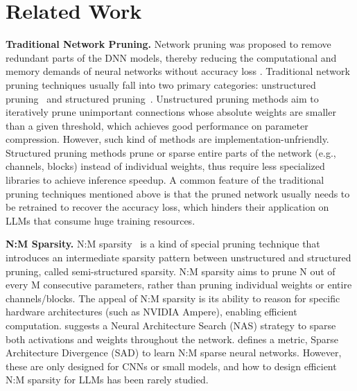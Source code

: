 \section{Related Work}

 \textbf{Traditional Network Pruning.} 
 Network pruning was proposed to remove redundant parts of the DNN models, thereby reducing the computational and memory demands of neural networks without accuracy loss \cite{liu2018rethinking,louizos2017learning, han2015deep, hassibi1993optimal}. 
 Traditional network pruning techniques usually fall into two primary categories: unstructured pruning~\cite{hassibi1993optimal, han2015learning, han2015deep} and structured pruning~\cite{li2016pruning, luo2017thinet, liu2017learning, li2020weight, li2022weight, ding2021resrep, li2021boosting, xia2022structured}.  
 Unstructured pruning methods \cite{han2015deep, han2015learning} aim to iteratively prune unimportant connections whose absolute weights are smaller than a given threshold, which achieves good performance on parameter compression. 
 However, such kind of methods are implementation-unfriendly.
  Structured pruning methods \cite{li2016pruning, luo2017thinet, liu2019metapruning} prune or sparse entire parts of the network (e.g., channels, blocks) instead of individual weights, thus require less specialized libraries to achieve inference speedup.
 A common feature of the traditional pruning techniques mentioned above is that the pruned network usually needs to be retrained to recover the accuracy loss, which hinders their application on LLMs that consume huge training resources.
 

\textbf{N:M Sparsity.} N:M sparsity~\cite{mishra2021accelerating,pool2021channel,akiva2022searching,zhou2021learning} is a kind of special pruning technique that introduces an intermediate sparsity pattern between unstructured and structured pruning, called semi-structured sparsity. N:M sparsity aims to prune N out of every M consecutive parameters, rather than pruning individual weights or entire channels/blocks. The appeal of N:M sparsity is its ability to reason for specific hardware architectures (such as NVIDIA Ampere\cite{pool2020accelerating}), enabling efficient computation. \cite{akiva2022searching} suggests a Neural Architecture Search (NAS) strategy to sparse both activations and weights throughout the network. \cite{zhou2021learning} defines a metric, Sparse Architecture Divergence (SAD) to learn N:M sparse neural networks. However, these are only designed for CNNs or small models, and how to design efficient N:M sparsity for LLMs has been rarely studied.

